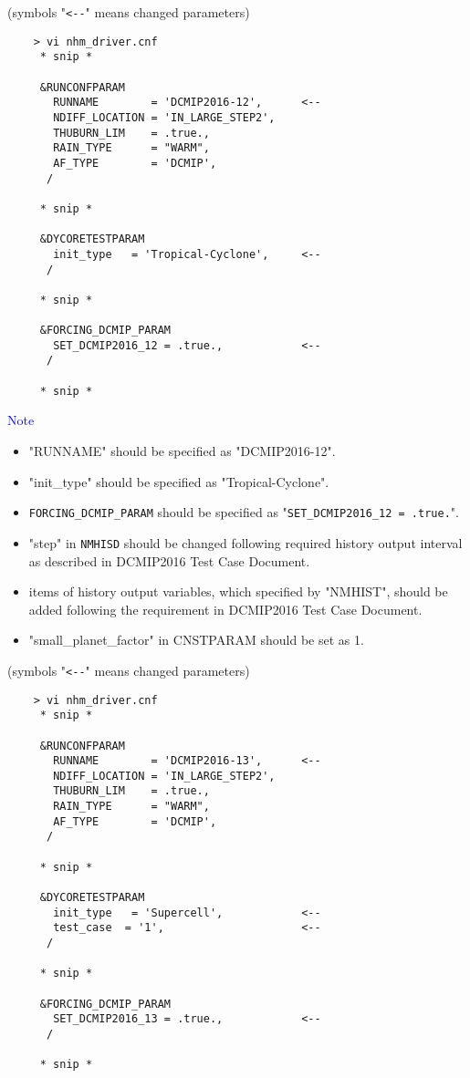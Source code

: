\documentclass[a4paper]{article}
\begin{document}
 \vspace{0.5cm}

 (symbols "\verb|<--|" means changed parameters)
 \begin{verbatim}
    > vi nhm_driver.cnf
     * snip *

     &RUNCONFPARAM
       RUNNAME        = 'DCMIP2016-12',      <--
       NDIFF_LOCATION = 'IN_LARGE_STEP2',
       THUBURN_LIM    = .true.,
       RAIN_TYPE      = "WARM",
       AF_TYPE        = 'DCMIP',
      /

     * snip *

     &DYCORETESTPARAM
       init_type   = 'Tropical-Cyclone',     <--
      /

     * snip *

     &FORCING_DCMIP_PARAM
       SET_DCMIP2016_12 = .true.,            <--
      /

     * snip *
 \end{verbatim}

 \noindent \textcolor{blue}{{\sf Note}}
 \begin{itemize}
   \item "RUNNAME" should be specified as "DCMIP2016-12".
   \item "init\_type" should be specified as "Tropical-Cyclone".
   \item \verb|FORCING_DCMIP_PARAM| should be specified as "\verb|SET_DCMIP2016_12 = .true.|".
   \item "step" in \verb|NMHISD| should be changed following required history output interval
           as described in DCMIP2016 Test Case Document.
   \item items of history output variables, which specified by "NMHIST", should be added
         following the requirement in DCMIP2016 Test Case Document.
   \item "small\_planet\_factor" in CNSTPARAM should be set as 1.
 \end{itemize}


 \vspace{0.5cm}

 (symbols "\verb|<--|" means changed parameters)
 \begin{verbatim}
    > vi nhm_driver.cnf
     * snip *

     &RUNCONFPARAM
       RUNNAME        = 'DCMIP2016-13',      <--
       NDIFF_LOCATION = 'IN_LARGE_STEP2',
       THUBURN_LIM    = .true.,
       RAIN_TYPE      = "WARM",
       AF_TYPE        = 'DCMIP',
      /

     * snip *

     &DYCORETESTPARAM
       init_type   = 'Supercell',            <--
       test_case  = '1',                     <--
      /

     * snip *

     &FORCING_DCMIP_PARAM
       SET_DCMIP2016_13 = .true.,            <--
      /

     * snip *
 \end{verbatim}
\end{document}
